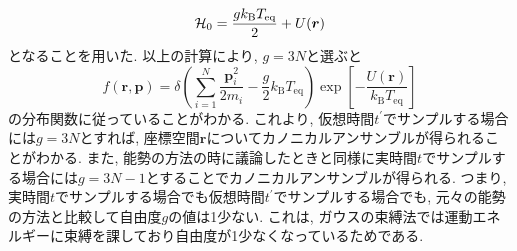 \begin{equation}
    \mathcal{H}_{0} = \frac{g k_{\mathrm{B}} T_{\mathrm{eq}}}{2} + U(\bm{r})
    \notag
\end{equation}
となることを用いた.
以上の計算により, $g = 3N$と選ぶと
\begin{equation}
    f(\bm{r}, \bm{p})
    =
    \delta
    \left(
        \sum_{i=1}^{N}
        \frac{\bm{p}_{i}^{2}}{2m_{i}}
        -
        \frac{g}{2} k_{\mathrm{B}} T_{\mathrm{eq}}
    \right)
    \exp
    \left[
        - \frac{U(\bm{r})}{k_{\mathrm{B}} T_{\mathrm{eq}}}
    \right]
\end{equation}
の分布関数に従っていることがわかる.
これより, 仮想時間$t^{\prime}$でサンプルする場合には$g = 3N$とすれば, 座標空間$\bm{r}$についてカノニカルアンサンブルが得られることがわかる.
また, 能勢の方法の時に議論したときと同様に実時間$t$でサンプルする場合には$g = 3N-1$とすることでカノニカルアンサンブルが得られる.
つまり, 実時間$t$でサンプルする場合でも仮想時間$t^{\prime}$でサンプルする場合でも, 元々の能勢の方法と比較して自由度$g$の値は1少ない.
これは, ガウスの束縛法では運動エネルギーに束縛を課しており自由度が1少なくなっているためである.

